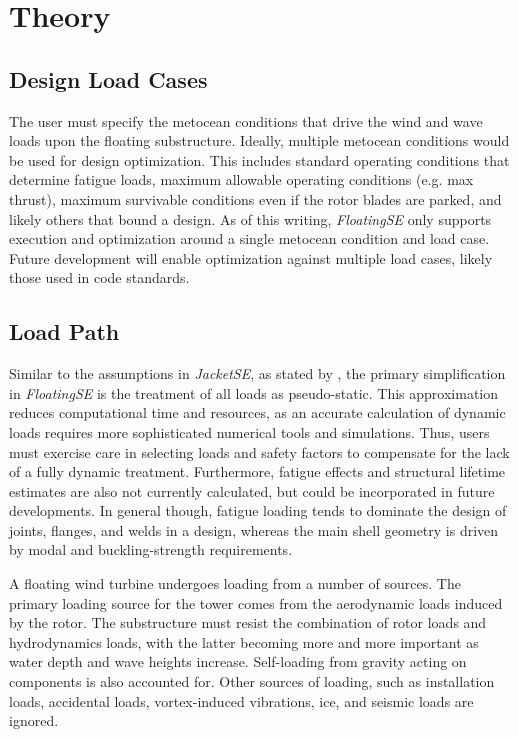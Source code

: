 \chapter{Theory}
\label{sec:theory}

\section{Design Load Cases}
The user must specify the metocean conditions that drive the wind and
wave loads upon the floating substructure.  Ideally, multiple metocean
conditions would be used for design optimization.  This includes
standard operating conditions that determine fatigue loads, maximum
allowable operating conditions (e.g. max thrust), maximum survivable
conditions even if the rotor blades are parked, and likely others that
bound a design.  As of this writing, \textit{FloatingSE} only supports
execution and optimization around a single metocean condition and load
case.  Future development will enable optimization against multiple load
cases, likely those used in code standards.

\section{Load Path}
Similar to the assumptions in \textit{JacketSE}, as stated by
\citep{JacketSE}, the primary simplification in \textit{FloatingSE} is
the treatment of all loads as pseudo-static. This approximation reduces
computational time and resources, as an accurate calculation of dynamic
loads requires more sophisticated numerical tools and simulations.
Thus, users must exercise care in selecting loads and safety factors to
compensate for the lack of a fully dynamic treatment.  Furthermore,
fatigue effects and structural lifetime estimates are also not currently
calculated, but could be incorporated in future developments.  In
general though, fatigue loading tends to dominate the design of joints,
flanges, and welds in a design, whereas the main shell geometry is
driven by modal and buckling-strength requirements.

A floating wind turbine undergoes loading from a number of sources.  The
primary loading source for the tower comes from the aerodynamic loads
induced by the rotor. The substructure must resist the combination of
rotor loads and hydrodynamics loads, with the latter becoming more and
more important as water depth and wave heights increase.  Self-loading
from gravity acting on components is also accounted for. Other sources
of loading, such as installation loads, accidental loads, vortex-induced
vibrations, ice, and seismic loads are ignored.

